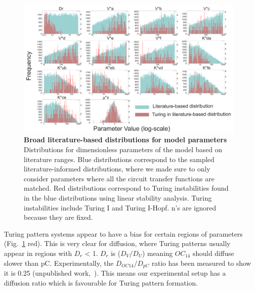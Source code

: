 \begin{figure}[H] %
    \centering
    \begin{adjustbox}{center}
        \includegraphics[width=1.2\textwidth]{chapters/Chapter 2/param_distributions} %
    \end{adjustbox}
    \caption{\textbf{Broad literature-based distributions for model parameters} Distributions for dimensionless parameters of the model based on literature ranges.
    Blue distributions correspond to the sampled literature-informed distributions,
    where we made sure to only consider parameters where all the circuit transfer functions are matched.
    Red distributions correspond to Turing instabilities found in the blue distributions using linear stability analysis. Turing instabilities include Turing I and Turing I-Hopf. n's are ignored because they are fixed.}
    \label{fig:param_distributions_turing_vs_noturing} %
\end{figure}

Turing pattern systems appear to have a bias for certain regions of parameters (Fig.~\ref{fig:param_distributions_turing_vs_noturing} red).
This is very clear for diffusion, where Turing patterns usually appear in regions with $D_r$ < 1.
$D_r$ is ($D_V / D_U$) meaning $OC_{14}$ should diffuse slower than pC.
Experimentally, the $D_{OC14}/D_{pC}$ ratio has been measured to show it is 0.25 (unpublished work,~\cite{tica_diffusers}).
This means our experimental setup has a diffusion ratio which is favourable for Turing pattern formation.

